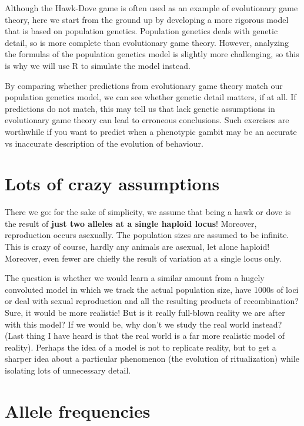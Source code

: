 \documentclass[
]{book}
\begin{document}
Although the Hawk-Dove game is often used as an example of evolutionary game theory, here we start from the ground up by developing a more rigorous model that is based on population genetics. Population genetics deals with genetic detail, so is more complete than evolutionary game theory. However, analyzing the formulas of the population genetics model is slightly more challenging, so this is why we will use R to simulate the model instead.

By comparing whether predictions from evolutionary game theory match our population genetics model, we can see whether genetic detail matters, if at all. If predictions do not match, this may tell us that lack genetic assumptions in evolutionary game theory can lead to erroneous conclusions. Such exercises are worthwhile if you want to predict when a phenotypic gambit may be an accurate vs inaccurate description of the evolution of behaviour.

\hypertarget{lots-of-crazy-assumptions}{%
\section{Lots of crazy assumptions}\label{lots-of-crazy-assumptions}}

There we go: for the sake of simplicity, we assume that being a hawk or dove is the result
of \textbf{just two alleles at a single haploid locus}! Moreover, reproduction occurs asexually. The population sizes are assumed to be infinite.
This is crazy of course, hardly any animals are asexual, let alone haploid! Moreover, even
fewer are chiefly the result of variation at a single locus only.

The question is whether we would learn a similar amount from a hugely convoluted model in which we track the actual population size, have 1000s of loci or deal with sexual reproduction and all the resulting products of recombination? Sure, it would be more realistic! But is it really full-blown reality we are after with this model? If we would be, why don't we study the real world instead? (Last thing I have heard is that the real world is a far more realistic model of reality). Perhaps the idea of a model is not to replicate reality, but to get a sharper idea about a particular phenomenon (the evolution of ritualization) while isolating lots of unnecessary detail.

\hypertarget{allele-frequencies}{%
\section{Allele frequencies}\label{allele-frequencies}}
\end{document}
